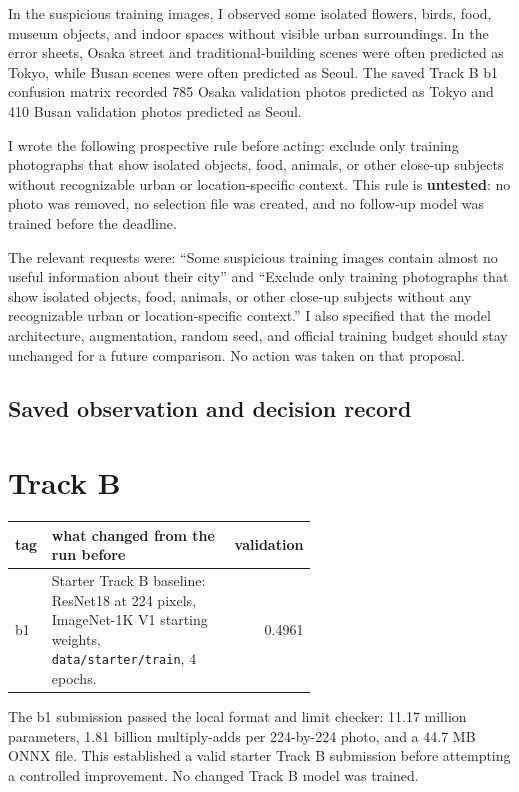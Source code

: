 \documentclass[11pt]{article}
\begin{document}
In the suspicious training images, I observed some isolated flowers, birds, food, museum objects, and indoor spaces without visible urban surroundings. In the error sheets, Osaka street and traditional-building scenes were often predicted as Tokyo, while Busan scenes were often predicted as Seoul. The saved Track B b1 confusion matrix recorded 785 Osaka validation photos predicted as Tokyo and 410 Busan validation photos predicted as Seoul.

I wrote the following prospective rule before acting: exclude only training photographs that show isolated objects, food, animals, or other close-up subjects without recognizable urban or location-specific context. This rule is \textbf{untested}: no photo was removed, no selection file was created, and no follow-up model was trained before the deadline.

The relevant requests were: ``Some suspicious training images contain almost no useful information about their city'' and ``Exclude only training photographs that show isolated objects, food, animals, or other close-up subjects without any recognizable urban or location-specific context.'' I also specified that the model architecture, augmentation, random seed, and official training budget should stay unchanged for a future comparison. No action was taken on that proposal.

\subsection*{Saved observation and decision record}

\section*{Track B}

\begin{center}\footnotesize
\begin{tabular}{lp{0.6\linewidth}r}
\toprule
tag & what changed from the run before & validation \\
\midrule
b1 & Starter Track B baseline: ResNet18 at 224 pixels, ImageNet-1K V1 starting weights, \texttt{data/starter/train}, 4 epochs. & 0.4961 \\
\bottomrule
\end{tabular}
\end{center}

The b1 submission passed the local format and limit checker: 11.17 million parameters, 1.81 billion multiply-adds per 224-by-224 photo, and a 44.7 MB ONNX file. This established a valid starter Track B submission before attempting a controlled improvement. No changed Track B model was trained.
\end{document}
